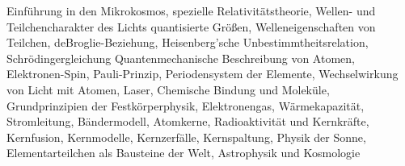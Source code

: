 \begin{module}
\begin{content}
Einführung in den Mikrokosmos, spezielle Relativitätstheorie, Wellen- und Teilchencharakter des Lichts quantisierte Größen, Welleneigenschaften von Teilchen, deBroglie-Beziehung, Heisenberg'sche Unbestimmtheitsrelation, Schrödingergleichung Quantenmechanische Beschreibung von Atomen, Elektronen-Spin, Pauli-Prinzip, Periodensystem der Elemente, Wechselwirkung von Licht mit Atomen, Laser, Chemische Bindung und Moleküle, Grundprinzipien der Festkörperphysik, Elektronengas, Wärmekapazität, Stromleitung, Bändermodell, Atomkerne, Radioaktivität und Kernkräfte, Kernfusion, Kernmodelle, Kernzerfälle, Kernspaltung, Physik der Sonne, Elementarteilchen als Bausteine der Welt, Astrophysik und Kosmologie


\end{content}



\end{module}

